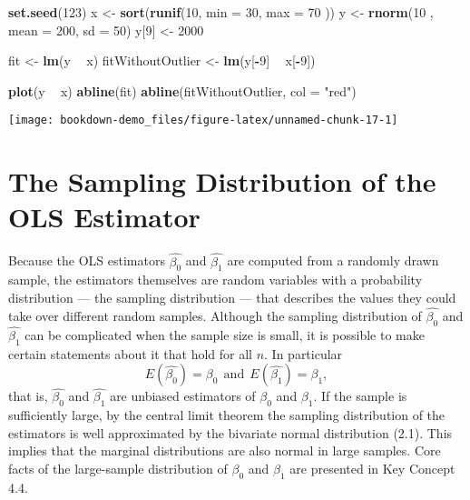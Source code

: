 \documentclass[]{book}
\newenvironment{Shaded}{\begin{snugshade}}{\end{snugshade}}
\newcommand{\KeywordTok}[1]{\textcolor[rgb]{0.13,0.29,0.53}{\textbf{#1}}}
\newcommand{\DataTypeTok}[1]{\textcolor[rgb]{0.13,0.29,0.53}{#1}}
\newcommand{\DecValTok}[1]{\textcolor[rgb]{0.00,0.00,0.81}{#1}}
\newcommand{\StringTok}[1]{\textcolor[rgb]{0.31,0.60,0.02}{#1}}
\newcommand{\OperatorTok}[1]{\textcolor[rgb]{0.81,0.36,0.00}{\textbf{#1}}}
\newcommand{\NormalTok}[1]{#1}
\theoremstyle{definition}
\theoremstyle{definition}
\theoremstyle{definition}
\theoremstyle{remark}
\begin{document}
\begin{Shaded}
\begin{Highlighting}[]
\KeywordTok{set.seed}\NormalTok{(}\DecValTok{123}\NormalTok{)}
\NormalTok{x     <-}\StringTok{ }\KeywordTok{sort}\NormalTok{(}\KeywordTok{runif}\NormalTok{(}\DecValTok{10}\NormalTok{, }\DataTypeTok{min =} \DecValTok{30}\NormalTok{, }\DataTypeTok{max =} \DecValTok{70}\NormalTok{ ))}
\NormalTok{y     <-}\StringTok{ }\KeywordTok{rnorm}\NormalTok{(}\DecValTok{10}\NormalTok{ , }\DataTypeTok{mean =} \DecValTok{200}\NormalTok{, }\DataTypeTok{sd =} \DecValTok{50}\NormalTok{)}
\NormalTok{y[}\DecValTok{9}\NormalTok{] <-}\StringTok{ }\DecValTok{2000}

\NormalTok{fit               <-}\StringTok{ }\KeywordTok{lm}\NormalTok{(y }\OperatorTok{~}\StringTok{ }\NormalTok{x)}
\NormalTok{fitWithoutOutlier <-}\StringTok{ }\KeywordTok{lm}\NormalTok{(y[}\OperatorTok{-}\DecValTok{9}\NormalTok{] }\OperatorTok{~}\StringTok{ }\NormalTok{x[}\OperatorTok{-}\DecValTok{9}\NormalTok{])}

\KeywordTok{plot}\NormalTok{(y }\OperatorTok{~}\StringTok{ }\NormalTok{x)}
\KeywordTok{abline}\NormalTok{(fit)}
\KeywordTok{abline}\NormalTok{(fitWithoutOutlier, }\DataTypeTok{col =} \StringTok{"red"}\NormalTok{)}
\end{Highlighting}
\end{Shaded}

\begin{center}\texttt{[image: bookdown-demo\_files/figure-latex/unnamed-chunk-17-1]} \end{center}

\hypertarget{vizslrm}{}

\section{The Sampling Distribution of the OLS
Estimator}\label{the-sampling-distribution-of-the-ols-estimator}

Because the OLS estimators \(\hat{\beta_0}\) and \(\hat{\beta_1}\) are
computed from a randomly drawn sample, the estimators themselves are
random variables with a probability distribution --- the sampling
distribution --- that describes the values they could take over
different random samples. Although the sampling distribution of
\(\hat{\beta_0}\) and \(\hat{\beta_1}\) can be complicated when the
sample size is small, it is possible to make certain statements about it
that hold for all \(n\). In particular
\[ E(\hat{\beta_0}) = \beta_0 \ \ \text{and} \ \  E(\hat{\beta_1}) = \beta_1,\]
that is, \(\hat{\beta_0}\) and \(\hat{\beta_1}\) are unbiased estimators
of \(\beta_0\) and \(\beta_1\). If the sample is sufficiently large, by
the central limit theorem the sampling distribution of the estimators is
well approximated by the bivariate normal distribution (2.1). This
implies that the marginal distributions are also normal in large
samples. Core facts of the large-sample distribution of \(\beta_0\) and
\(\beta_1\) are presented in Key Concept 4.4.
\end{document}
